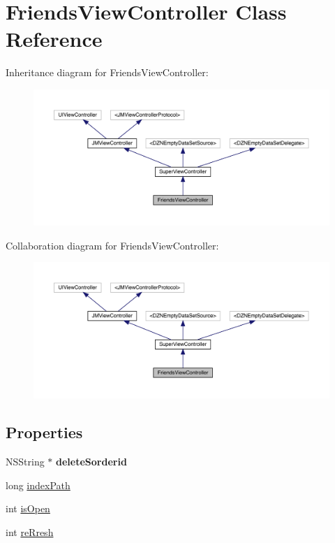 \hypertarget{interface_friends_view_controller}{}\section{Friends\+View\+Controller Class Reference}
\label{interface_friends_view_controller}


Inheritance diagram for Friends\+View\+Controller\+:\nopagebreak
\begin{figure}[H]
\begin{center}
\leavevmode
\includegraphics[width=350pt]{interface_friends_view_controller__inherit__graph}
\end{center}
\end{figure}


Collaboration diagram for Friends\+View\+Controller\+:\nopagebreak
\begin{figure}[H]
\begin{center}
\leavevmode
\includegraphics[width=350pt]{interface_friends_view_controller__coll__graph}
\end{center}
\end{figure}
\subsection*{Properties}
\begin{DoxyCompactItemize}
\item 
\mbox{\label{interface_friends_view_controller_abd7ab142d8242549321ad18c43f35dfd}} 
N\+S\+String $\ast$ {\bfseries delete\+Sorderid}
\item 
long \mbox{\hyperlink{interface_friends_view_controller_aef65807186bcbac952fa266b5d2271a0}{index\+Path}}
\item 
int \mbox{\hyperlink{interface_friends_view_controller_aab9f502bd98a053e5793fe2e55dbae91}{is\+Open}}
\item 
int \mbox{\hyperlink{interface_friends_view_controller_a811806e51a6fff3e5304822088d9f92f}{re\+Rresh}}
\end{DoxyCompactItemize}
